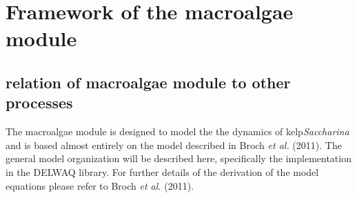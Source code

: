 \documentclass{article}
\begin{document}
\section{Framework of the macroalgae module}

\subsection{relation of macroalgae module to other processes}

The macroalgae module is designed to model the the dynamics of kelp\textit{Saccharina} and is based almost entirely on the model described in Broch \textit{et al.} (2011). The general model organization will be described here, specifically the implementation in the DELWAQ library. For further details of the derivation of the model equations please refer to Broch \textit{et al.} (2011).
\end{document}
